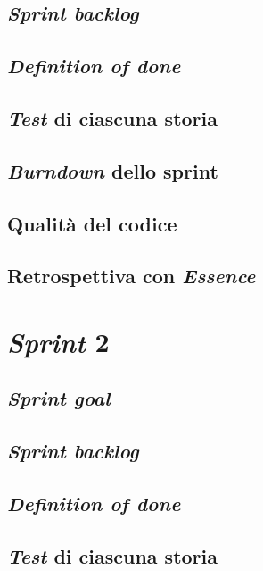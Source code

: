 \documentclass{article}
\begin{document}
\subsection{\emph{Sprint backlog}}

\subsection{\emph{Definition of done}}

\subsection{\emph{Test} di ciascuna storia}

\subsection{\emph{Burndown} dello sprint}

\subsection{Qualità del codice}

\subsection{Retrospettiva con \emph{Essence}}

\section{\emph{Sprint} 2}

\subsection{\emph{Sprint goal}}

\subsection{\emph{Sprint backlog}}

\subsection{\emph{Definition of done}}

\subsection{\emph{Test} di ciascuna storia}
\end{document}
